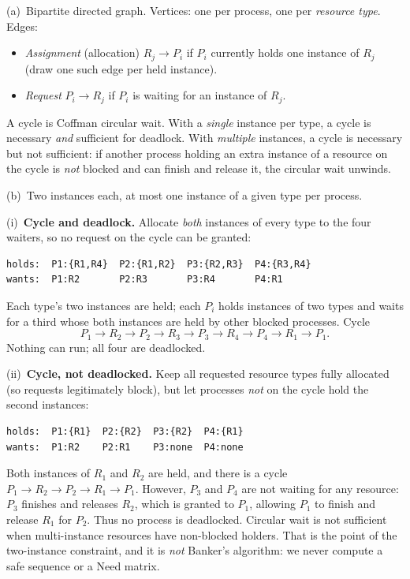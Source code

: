 \documentclass[11pt,a4paper]{article}
\newenvironment{Sol}{%
  \begin{tcolorbox}[sboxstyle, title={Solution}]%
}{%
  \end{tcolorbox}\vspace{0.35em}%
}
\begin{document}
\begin{Sol}
(a)~Bipartite directed graph. Vertices: one per process, one per
\emph{resource type}. Edges:
\begin{itemize}
  \item \emph{Assignment} (allocation) $R_j \to P_i$ if $P_i$ currently
        holds one instance of $R_j$ (draw one such edge per held
        instance).
  \item \emph{Request} $P_i \to R_j$ if $P_i$ is waiting for an instance
        of $R_j$.
\end{itemize}
A cycle is Coffman circular wait. With a \emph{single} instance per type,
a cycle is necessary \emph{and} sufficient for deadlock. With \emph{multiple} instances, a cycle is necessary but not sufficient: if
another process holding an extra instance of a resource on the cycle is
\emph{not} blocked and can finish and release it, the circular wait unwinds.

(b)~Two instances each, at most one instance of a given type per process.

(i)~\textbf{Cycle and deadlock.} Allocate \emph{both} instances of every
type to the four waiters, so no request on the cycle can be granted:
\begin{lstlisting}[numbers=none]
holds:  P1:{R1,R4}  P2:{R1,R2}  P3:{R2,R3}  P4:{R3,R4}
wants:  P1:R2       P2:R3       P3:R4       P4:R1
\end{lstlisting}
Each type's two instances are held; each $P_i$ holds instances of two types
and waits for a third whose both instances are held by other blocked processes. Cycle
\[
P_1 \to R_2 \to P_2 \to R_3 \to P_3 \to R_4 \to P_4 \to R_1 \to P_1.
\]
Nothing can run; all four are deadlocked.

(ii)~\textbf{Cycle, not deadlocked.} Keep all requested resource types
fully allocated (so requests legitimately block), but let processes
\emph{not} on the cycle hold the second instances:
\begin{lstlisting}[numbers=none]
holds:  P1:{R1}  P2:{R2}  P3:{R2}  P4:{R1}
wants:  P1:R2    P2:R1    P3:none  P4:none
\end{lstlisting}
Both instances of $R_1$ and $R_2$ are held, and there is a cycle
$P_1 \to R_2 \to P_2 \to R_1 \to P_1$. However, $P_3$ and $P_4$ are not
waiting for any resource: $P_3$ finishes and releases $R_2$, which is
granted to $P_1$, allowing $P_1$ to finish and release $R_1$ for $P_2$.
Thus no process is deadlocked. Circular wait is not sufficient when
multi-instance resources have non-blocked holders. That is the point of
the two-instance constraint, and it is \emph{not} Banker's algorithm: we
never compute a safe sequence or a Need matrix.
\end{Sol}
\end{document}
